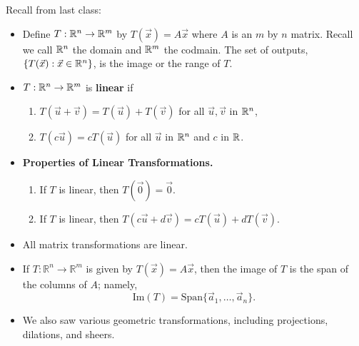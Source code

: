 \documentclass[12pt,letterpaper]{article}
\begin{document}
\thispagestyle{fancy}

Recall from last class:

\begin{itemize}

\item Define $T : \mathbb{R}^n \to \mathbb{R}^m$ by $T(\vec{x})=A\vec{x}$ where $A$ is an $m$ by $n$ matrix. Recall we call $\mathbb{R}^n$ the domain and $\mathbb{R}^m$ the codmain. The set of outputs, $\{T(\vec{x}):\vec{x}\in \mathbb{R}^n\}$, is the image or the range of $T$.
\item $T : \mathbb{R}^n \to \mathbb{R}^m$ is {\bf linear} if 
\begin{enumerate}
	\item $T(\vec{u}+\vec{v})=T(\vec{u})+T(\vec{v})$ for all $\vec{u},\vec{v}$ in $\mathbb{R}^n$,
	\item $T(c\vec{u})=cT(\vec{u})$ for all $\vec{u}$ in $\mathbb{R}^n$ and $c$ in $\mathbb{R}$.
\end{enumerate}
\item {\bf Properties of Linear Transformations.}
\begin{enumerate}
\item If $T$ is linear, then $T(\vec{0})=\vec{0}$.
\item If $T$ is linear, then $T(c\vec{u}+d\vec{v})=cT(\vec{u})+dT(\vec{v})$.
\end{enumerate} 
\item All matrix transformations are linear.
\item If $T:\mathbb{R}^n \to \mathbb{R}^m$ is given by $T(\vec{x})=A\vec{x}$, then the image of $T$ is the span of the columns of $A$; namely, $$\text{Im}(T)= \text{Span}\{ \vec{a}_1, \dots, \vec{a}_n\}.$$
\item We also saw various geometric transformations, including projections, dilations, and sheers.
\end{itemize}

\newpage
\end{document}
